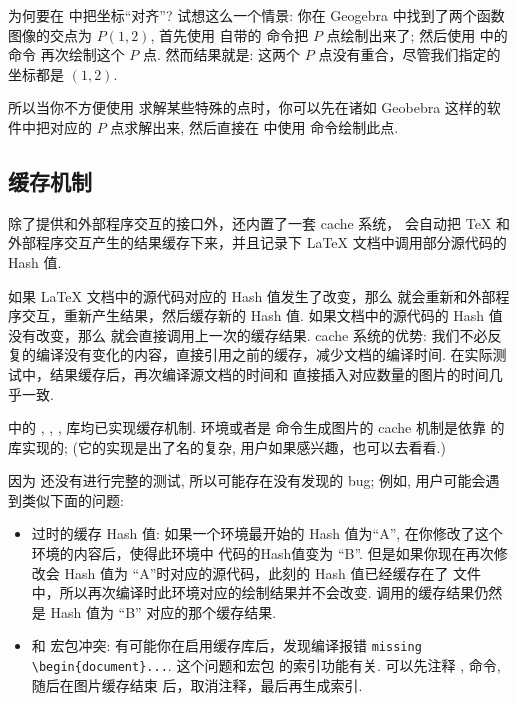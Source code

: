 \documentclass[
  hyper, 
  lang = cn, 
  class = l3doc,
  classOption={11pt},
  sect = {load=false},
]{../../zlatex/code/ztex}
\begin{document}
为何要在 \zTikZ{} 中把坐标``对齐''? 试想这么一个情景: 你在 Geogebra 中找到了两个函数图像的交点为 $P(1, 2)$,
首先使用 \TikZ{} 自带的 \cmd{\filldraw} 命令把 $P$ 点绘制出来了; 然后使用 \zTikZ{} 中的 \cmd{\ShowPoint} 命令
再次绘制这个 $P$ 点. 然而结果就是: 这两个 $P$ 点没有重合，尽管我们指定的坐标都是 $(1, 2)$.

所以当你不方便使用 \zTikZ{} 求解某些特殊的点时，你可以先在诸如 Geobebra 这样的软件中把对应的 $P$ 
点求解出来, 然后直接在 \zTikZ{} 中使用 \cmd{\ShowPoint} 命令绘制此点.


\subsection{缓存机制}
\zTikZ{} 除了提供和外部程序交互的接口外，还内置了一套 cache 系统，\zTikZ{} 会自动把 \TeX{} 和
外部程序交互产生的结果缓存下来，并且记录下 \LaTeX{} 文档中调用部分源代码的 Hash 值. 

如果 \LaTeX{} 文档中的源代码对应的 Hash 值发生了改变，那么 \zTikZ{} 就会重新和外部程序交互，重新产生结果，然后缓存新的 Hash 值.
如果文档中的源代码的 Hash 值没有改变，那么 \zTikZ{} 就会直接调用上一次的缓存结果. cache 系统的优势:
我们不必反复的编译没有变化的内容，直接引用之前的缓存，减少文档的编译时间. 在实际测试中，结果缓存后，再次编译源文档的时间和
直接插入对应数量的图片的时间几乎一致.

\zTikZ{} 中的 , , ,  库均已实现缓存机制. 
 环境或者是 \cmd{\tikz} 命令生成图片的 cache 机制是依靠 \TikZ{} 的  
库实现的; (它的实现是出了名的复杂, 用户如果感兴趣，也可以去看看.)


因为 \ztikz{} 还没有进行完整的测试, 所以可能存在没有发现的 bug; 例如, 用户可能会遇到类似下面的问题:
\begin{itemize}
  \item 过时的缓存 Hash 值: 如果一个环境最开始的 Hash 值为``A'', 在你修改了这个环境的内容后，使得此环境中
    代码的Hash值变为 ``B''. 但是如果你现在再次修改会 Hash 值为 ``A''时对应的源代码，此刻的 Hash 值已经缓存在了
    文件  中，所以再次编译时此环境对应的绘制结果并不会改变. 调用的缓存结果仍然是 Hash 值为 ``B''
    对应的那个缓存结果. 
  \item 和  宏包冲突: 有可能你在启用缓存库后，发现编译报错 \texttt{missing \textbackslash begin\{document\}...}. 
    这个问题和宏包  的索引功能有关. 可以先注释 ,  命令, 随后在图片缓存结束
    后，取消注释，最后再生成索引.
\end{itemize}
\end{document}
